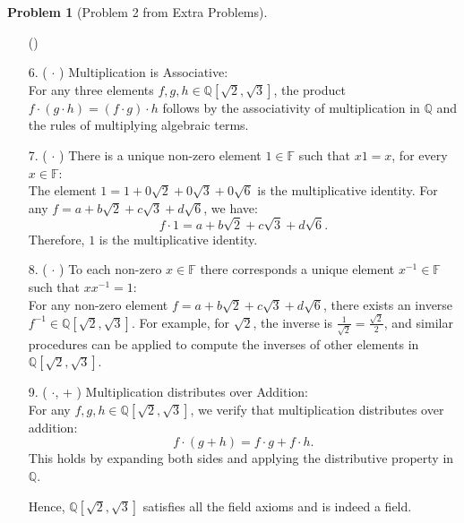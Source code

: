 \documentclass[12pt]{article}
\theoremstyle{definition}
\newtheorem{problem}{Problem}
\newcounter{subq}[problem]
\newenvironment{subproblem}
{\refstepcounter{subq} \begin{itemize} \item[(\alph{subq})]}
{\end{itemize} \medskip}
\begin{document}
\begin{problem}[Problem 2 from Extra Problems]
\begin{subproblem}
\begin{solution}
        6. ( $\cdot$ ) Multiplication is Associative:\\
        For any three elements \( f, g, h \in \mathbb{Q}[\sqrt{2}, \sqrt{3}] \), the product \( f \cdot (g \cdot h) = (f \cdot g) \cdot h \) follows by the associativity of multiplication in \( \mathbb{Q} \) and the rules of multiplying algebraic terms.

        7. ( $\cdot$ ) There is a unique non-zero element $1 \in \mathbb{F}$ such that $x1 = x$, for every $x\in\mathbb{F}$:\\
        The element \( 1 = 1 + 0 \sqrt{2} + 0 \sqrt{3} + 0 \sqrt{6} \) is the multiplicative identity. For any \( f = a + b \sqrt{2} + c \sqrt{3} + d \sqrt{6} \), we have:
        \[
        f \cdot 1 = a + b \sqrt{2} + c \sqrt{3} + d \sqrt{6}.
        \]
        Therefore, \( 1 \) is the multiplicative identity.

        8. ( $\cdot$ ) To each non-zero $x \in\mathbb{F}$ there corresponds a unique element $x^{-1}\in\mathbb{F}$ such that $xx^{-1} = 1$:\\
        For any non-zero element \( f = a + b \sqrt{2} + c \sqrt{3} + d \sqrt{6} \), there exists an inverse \( f^{-1} \in \mathbb{Q}[\sqrt{2}, \sqrt{3}] \). For example, for \( \sqrt{2} \), the inverse is \( \frac{1}{\sqrt{2}} = \frac{\sqrt{2}}{2} \), and similar procedures can be applied to compute the inverses of other elements in \( \mathbb{Q}[\sqrt{2}, \sqrt{3}] \).

        9. ( $\cdot$, + ) Multiplication distributes over Addition:\\
        For any \( f, g, h \in \mathbb{Q}[\sqrt{2}, \sqrt{3}] \), we verify that multiplication distributes over addition:
        \[
        f \cdot (g + h) = f \cdot g + f \cdot h.
        \]
        This holds by expanding both sides and applying the distributive property in \( \mathbb{Q} \).

        Hence, \( \mathbb{Q}[\sqrt{2}, \sqrt{3}] \) satisfies all the field axioms and is indeed a field.
    
        \end{solution}
    \end{subproblem}
\end{problem}
\end{document}
